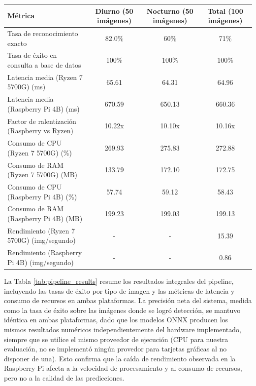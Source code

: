 \sffamily
\footnotesize
{}
\begin{tcolorbox}[
colback=white,
colframe=MASA-Blue,
title={Tabla~\thetable~Rendimiento integral del pipeline LPR-Sentinel},
boxrule=0.5mm,
arc=2mm,
width=\textwidth,
enhanced,
fonttitle=\bfseries,
before upper=\vspace{2mm},
after upper=\vspace{2mm}
]
\label{tab:pipeline_results}
\renewcommand{\arraystretch}{1.5}
\begin{tabularx}{\textwidth}{@{}X c c c@{}}
\textbf{Métrica} & \textbf{Diurno (50 imágenes)} & \textbf{Nocturno (50 imágenes)} & \textbf{Total (100 imágenes)} \\
\midrule
Tasa de reconocimiento exacto & 82.0\% & 60\% & 71\% \\ %
Tasa de éxito en consulta a base de datos & 100\% & 100\% & 100\% \\ %
\midrule
Latencia media (Ryzen 7 5700G) (ms) & 65.61 & 64.31 & 64.96 \\ %
Latencia media (Raspberry Pi 4B) (ms) & 670.59 & 650.13 & 660.36 \\ %
Factor de ralentización (Raspberry vs Ryzen) & 10.22x & 10.10x & 10.16x \\ %
\midrule
Consumo de CPU (Ryzen 7 5700G) (\%) & 269.93 & 275.83 & 272.88 \\ %
Consumo de RAM (Ryzen 7 5700G) (MB) & 133.79 & 172.10 & 172.75 \\ %
Consumo de CPU (Raspberry Pi 4B) (\%) & 57.74 & 59.12 & 58.43 \\ %
Consumo de RAM (Raspberry Pi 4B) (MB) & 199.23 & 199.03 & 199.13 \\ %
\midrule
Rendimiento (Ryzen 7 5700G) (img/segundo) & - & - & 15.39 \\ %
Rendimiento (Raspberry Pi 4B) (img/segundo) & - & - & 0.86 \\ %
\end{tabularx}
\end{tcolorbox}
\normalsize
\normalfont

La Tabla \ref{tab:pipeline_results} resume los resultados integrales del pipeline, incluyendo las tasas de éxito por tipo de imagen y las métricas de latencia y consumo de recursos en ambas plataformas. La precisión neta del sistema, medida como la tasa de éxito sobre las imágenes donde se logró detección, se mantuvo idéntica en ambas plataformas, dado que los modelos ONNX producen los mismos resultados numéricos independientemente del hardware implementado, siempre que se utilice el mismo proveedor de ejecución (CPU para nuestra evaluación, no se implementó ningún provedor para tarjetas gráficas al no disponer de una). Esto confirma que la caída de rendimiento observada en la Raspberry Pi afecta a la velocidad de procesamiento y al consumo de recursos, pero no a la calidad de las predicciones.

